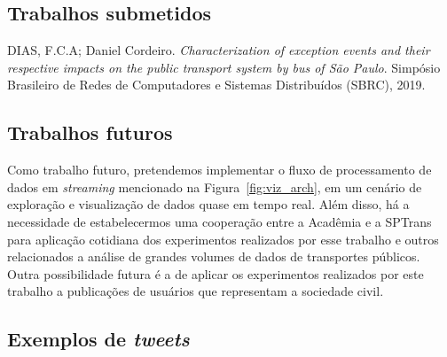 \documentclass[
	12pt,				%
	oneside,			%
	a4paper,			%
	english,			%
	brazil				%
	]{abntex2ppgsi}
\begin{document}
{{{\section{Trabalhos submetidos}

DIAS, F.C.A; Daniel Cordeiro. \textit{Characterization of exception events and their respective impacts on the public transport system by bus of São Paulo}. Simpósio Brasileiro de Redes de Computadores e Sistemas Distribuídos (SBRC), 2019.

\section{Trabalhos futuros}
Como trabalho futuro, pretendemos implementar o fluxo de processamento de dados em \textit{streaming} mencionado na Figura~\ref{fig:viz_arch}, em um cenário de exploração e visualização de dados quase em tempo real.  Além disso, há a necessidade de estabelecermos uma cooperação entre a Acadêmia e a SPTrans para aplicação cotidiana dos experimentos realizados por esse trabalho e outros relacionados a análise de grandes volumes de dados de transportes públicos. Outra possibilidade futura é a de aplicar os experimentos realizados por este trabalho a publicações de usuários que representam a sociedade civil.

\postextual



%
%


\begin{apendicesenv}

\partapendices
\chapter{Exemplos de \textit{tweets}}
\label{apendiceA}


\end{apendicesenv}}}}
\end{document}
